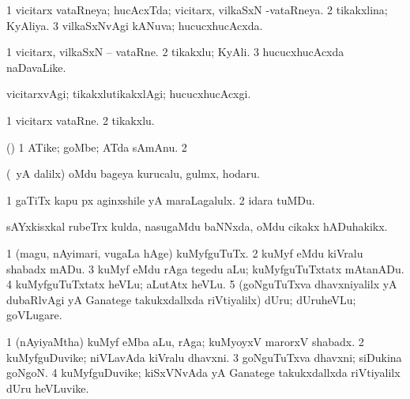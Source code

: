 {{{{{{\bentry
{} 
\gl{\gu}
\expl{}
\bmng
\bnum
\num{1} vicitarx vataRneya; hucAcxTda; vicitarx, vilkaSxN -vataRneya. 
\num{2} tikakxlina; KyAliya. 
\num{3} vilkaSxNvAgi kANuva; hucucxhucAcxda. 
\enum
\emng
\eentry

\bentry
{} 
\gl{\nA}
\expl{}
\bmng
\bnum
\num{1} vicitarx, vilkaSxN -- vataRne. 
\num{2} tikakxlu; KyAli. 
\num{3} hucucxhucAcxda naDavaLike. 
\enum
\emng
\eentry

\bentry
{} 
\gl{\kirxvi}
\expl{}
\bmng
vicitarxvAgi; tikakxlutikakxlAgi; hucucxhucAcxgi. 
\emng
\eentry

\bentry
{} 
\gl{\nA}
\expl{}
\bmng
\bnum
\num{1} vicitarx vataRne. 
\num{2} tikakxlu. 
\enum
\emng
\eentry

\bentry
{} 
\gl{\nA}
\bmng
{} 
\emng
\eentry

\bentry
{} 
\gl{\nA}
\expl{}
\bmng
(\pArxparx) 
\bnum
\num{1} ATike; goMbe; ATda sAmAnu. 
\num{2}  
\enum
\emng
\eentry

\bentry
{} 
\gl{\nA}
\expl{}
\bmng
(\Eva\ yA \bava dalilx) oMdu bageya kurucalu, gulmx, hodaru. 
\emng
\eentry

\bentry
{} 
\gl{\nA}
\expl{}
\bmng
\bnum
\num{1} gaTiTx kapu px aginxshile yA maraLagalulx. 
\num{2} idara tuMDu. 
\enum
\emng
\eentry

{} 
\gl{\nA}
\expl{}
\bmng
sAYxkisxkal rubeTrx kulda, nasugaMdu baNNxda, oMdu cikakx hADuhakikx. 
\emng
\eentry

\bentry
{} 
\gl{\akirx}
\expl{}
\bmng
\bnum
\num{1} (magu, nAyimari, \mo vugaLa hAge) kuMyfguTuTx. 
\num{2} kuMyf eMdu kiVralu shabadx mADu. 
\num{3} kuMyf eMdu rAga tegedu aLu; kuMyfguTuTxtatx mAtanADu. 
\num{4} kuMyfguTuTxtatx heVLu; aLutAtx heVLu. 
\num{5} (goNguTuTxva dhavxniyalilx yA dubaRlvAgi yA Ganatege takukxdallxda riVtiyalilx) dUru; dUruheVLu; goVLugare. 
\enum
\emng
\eentry

\bentry
{} 
\gl{\nA}
\expl{}
\bmng
\bnum
\num{1} (nAyiyaMtha) kuMyf eMba aLu, rAga; kuMyoyxV marorxV shabadx. 
\num{2} kuMyfguDuvike; niVLavAda kiVralu dhavxni. 
\num{3} goNguTuTxva dhavxni; siDukina goNgoN. 
\num{4} kuMyfguDuvike; kiSxVNvAda yA Ganatege takukxdallxda riVtiyalilx dUru heVLuvike. 
\enum
\emng
\eentry

}}}}}}
